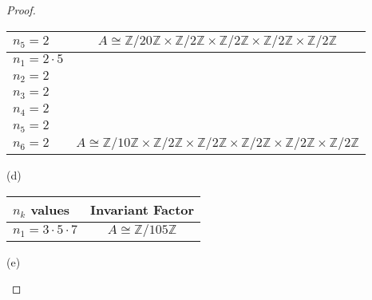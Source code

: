 \documentclass[10pt]{article}
\newcommand{\Z}{\mathbb{Z}}
\begin{document}
\begin{itemize}
\begin{proof}
\begin{item}
\begin{center}
\begin{tabular}{ l  c }
	$n_5=2$ & $A\cong \Z / 20\Z \times \Z / 2\Z \times \Z / 2\Z \times \Z / 2\Z \times \Z / 2\Z$ \\ \hline
	\hline
	$n_1=2 \cdot 5$ & \\ \hline
	$n_2=2$ & \\ \hline
	$n_3=2$ & \\ \hline
	$n_4=2$ & \\ \hline
	$n_5=2$ & \\ \hline
	$n_6=2$ & $A\cong \Z / 10\Z \times \Z / 2\Z \times \Z / 2\Z \times \Z / 2\Z \times \Z / 2\Z \times \Z / 2\Z$ \\ \hline
	\hline
  \end{tabular}
\end{center} 

\end{item}

\begin{item} (d)

\begin{center}
  \begin{tabular}{ l  c }
    $n_k$ values & Invariant Factor \\ \hline
    $n_1=3 \cdot 5 \cdot 7$ & $A\cong \Z / 105\Z$ \\ \hline
	\hline   
  \end{tabular}
\end{center} 

\end{item}

\begin{item} (e)


\end{item}
\end{proof}
\end{itemize}
\end{document}

